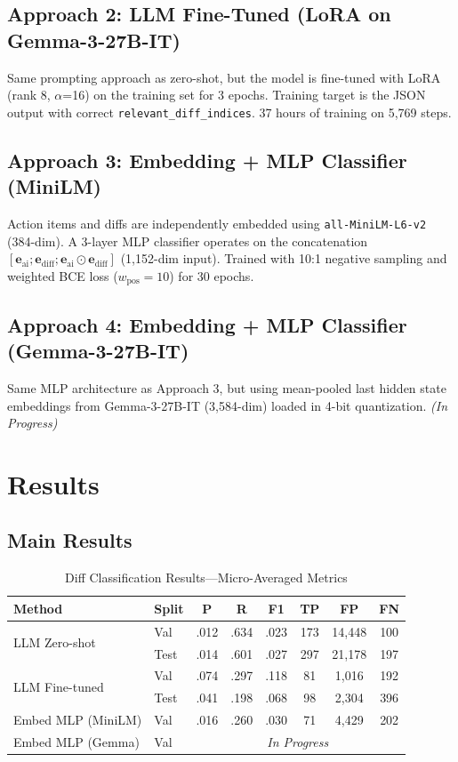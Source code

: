 \documentclass[11pt]{article}
\begin{document}
\subsection{Approach 2: LLM Fine-Tuned (LoRA on Gemma-3-27B-IT)}
Same prompting approach as zero-shot, but the model is fine-tuned with LoRA (rank 8, $\alpha$=16) on the training set for 3 epochs. Training target is the JSON output with correct \texttt{relevant\_diff\_indices}. 37 hours of training on 5{,}769 steps.

\subsection{Approach 3: Embedding + MLP Classifier (MiniLM)}
Action items and diffs are independently embedded using \texttt{all-MiniLM-L6-v2} (384-dim). A 3-layer MLP classifier operates on the concatenation $[\mathbf{e}_\text{ai}; \mathbf{e}_\text{diff}; \mathbf{e}_\text{ai} \odot \mathbf{e}_\text{diff}]$ (1{,}152-dim input). Trained with 10:1 negative sampling and weighted BCE loss ($w_\text{pos}=10$) for 30 epochs.

\subsection{Approach 4: Embedding + MLP Classifier (Gemma-3-27B-IT)}
Same MLP architecture as Approach 3, but using mean-pooled last hidden state embeddings from Gemma-3-27B-IT (3{,}584-dim) loaded in 4-bit quantization. \textit{(In Progress)}

\section{Results}

\subsection{Main Results}

\begin{table}[h]
\centering
\caption{Diff Classification Results---Micro-Averaged Metrics}
\label{tab:diff_cls_micro}
\begin{tabular}{llcccccc}
\toprule
Method & Split & P & R & F1 & TP & FP & FN \\
\midrule
\multirow{2}{*}{LLM Zero-shot}
 & Val  & .012 & .634 & .023 & 173 & 14{,}448 & 100 \\
 & Test & .014 & .601 & .027 & 297 & 21{,}178 & 197 \\
\midrule
\multirow{2}{*}{LLM Fine-tuned}
 & Val  & .074 & .297 & .118 & 81 & 1{,}016 & 192 \\
 & Test & .041 & .198 & .068 & 98 & 2{,}304 & 396 \\
\midrule
Embed MLP (MiniLM)
 & Val  & .016 & .260 & .030 & 71 & 4{,}429 & 202 \\
\midrule
\rowcolor{yellow!20}
Embed MLP (Gemma)
 & Val  & \multicolumn{6}{c}{\textit{In Progress}} \\
\bottomrule
\end{tabular}
\end{table}
\end{document}
